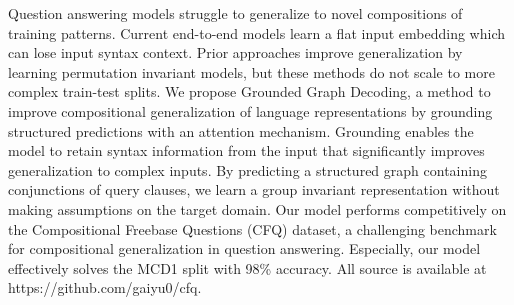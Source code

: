 Question answering models struggle to generalize to novel compositions of training patterns. Current end-to-end models learn a flat input embedding which can lose input syntax context. Prior approaches improve generalization by learning permutation invariant models, but these methods do not scale to more complex train-test splits. We propose Grounded Graph Decoding, a method to improve compositional generalization of language representations by grounding structured predictions with an attention mechanism. Grounding enables the model to retain syntax information from the input that significantly improves generalization to complex inputs. By predicting a structured graph containing conjunctions of query clauses, we learn a group invariant representation without making assumptions on the target domain. Our model performs competitively on the Compositional Freebase Questions (CFQ) dataset, a challenging benchmark for compositional generalization in question answering. Especially, our model effectively solves the MCD1 split with 98\% accuracy. All source is available at https://github.com/gaiyu0/cfq.
